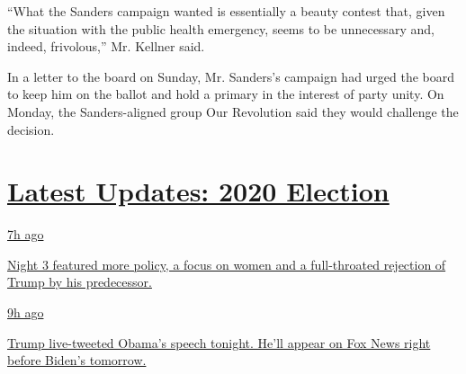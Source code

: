 ``What the Sanders campaign wanted is essentially a beauty contest that,
given the situation with the public health emergency, seems to be
unnecessary and, indeed, frivolous,'' Mr. Kellner said.

In a letter to the board on Sunday, Mr. Sanders's campaign had urged the
board to keep him on the ballot and hold a primary in the interest of
party unity. On Monday, the Sanders-aligned group Our Revolution said
they would challenge the decision.

\hypertarget{latest-updates-2020-election}{%
\section{\texorpdfstring{\href{https://www.nytimes3xbfgragh.onion/live/2020/08/19/us/dnc-convention-election?action=click\&pgtype=Article\&state=default\&region=MAIN_CONTENT_1\&context=storylines_live_updates}{Latest
Updates: 2020
Election}}{Latest Updates: 2020 Election}}\label{latest-updates-2020-election}}

\href{https://www.nytimes3xbfgragh.onion/live/2020/08/19/us/dnc-convention-election?action=click\&pgtype=Article\&state=default\&region=MAIN_CONTENT_1\&context=storylines_live_updates\#night-3-featured-more-policy-a-focus-on-women-and-a-full-throated-rejection-of-trump-by-his-predecessor}{7h
ago}

\href{https://www.nytimes3xbfgragh.onion/live/2020/08/19/us/dnc-convention-election?action=click\&pgtype=Article\&state=default\&region=MAIN_CONTENT_1\&context=storylines_live_updates\#night-3-featured-more-policy-a-focus-on-women-and-a-full-throated-rejection-of-trump-by-his-predecessor}{Night
3 featured more policy, a focus on women and a full-throated rejection
of Trump by his predecessor.}

\href{https://www.nytimes3xbfgragh.onion/live/2020/08/19/us/dnc-convention-election?action=click\&pgtype=Article\&state=default\&region=MAIN_CONTENT_1\&context=storylines_live_updates\#trump-live-tweeted-obamas-speech-tonight-hell-appear-on-fox-news-right-before-bidens-tomorrow}{9h
ago}

\href{https://www.nytimes3xbfgragh.onion/live/2020/08/19/us/dnc-convention-election?action=click\&pgtype=Article\&state=default\&region=MAIN_CONTENT_1\&context=storylines_live_updates\#trump-live-tweeted-obamas-speech-tonight-hell-appear-on-fox-news-right-before-bidens-tomorrow}{Trump
live-tweeted Obama's speech tonight. He'll appear on Fox News right
before Biden's tomorrow.}

